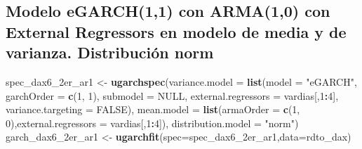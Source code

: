 \documentclass[
  11pt,
]{article}
\newenvironment{Shaded}{\begin{snugshade}}{\end{snugshade}}
\newcommand{\DataTypeTok}[1]{\textcolor[rgb]{0.13,0.29,0.53}{#1}}
\newcommand{\DecValTok}[1]{\textcolor[rgb]{0.00,0.00,0.81}{#1}}
\newcommand{\KeywordTok}[1]{\textcolor[rgb]{0.13,0.29,0.53}{\textbf{#1}}}
\newcommand{\NormalTok}[1]{#1}
\newcommand{\OperatorTok}[1]{\textcolor[rgb]{0.81,0.36,0.00}{\textbf{#1}}}
\newcommand{\OtherTok}[1]{\textcolor[rgb]{0.56,0.35,0.01}{#1}}
\newcommand{\StringTok}[1]{\textcolor[rgb]{0.31,0.60,0.02}{#1}}
\begin{document}
\hypertarget{modelo-egarch11-con-arma10-con-external-regressors-en-modelo-de-media-y-de-varianza.-distribuciuxf3n-norm}{%
\subsection{Modelo eGARCH(1,1) con ARMA(1,0) con External Regressors en
modelo de media y de varianza. Distribución
norm}\label{modelo-egarch11-con-arma10-con-external-regressors-en-modelo-de-media-y-de-varianza.-distribuciuxf3n-norm}}

\begin{Shaded}
\begin{Highlighting}[]
\NormalTok{spec_dax6_2er_ar1 <-}\StringTok{ }\KeywordTok{ugarchspec}\NormalTok{(}\DataTypeTok{variance.model =} \KeywordTok{list}\NormalTok{(}\DataTypeTok{model =} \StringTok{"eGARCH"}\NormalTok{, }\DataTypeTok{garchOrder =} \KeywordTok{c}\NormalTok{(}\DecValTok{1}\NormalTok{, }\DecValTok{1}\NormalTok{), }
                    \DataTypeTok{submodel =} \OtherTok{NULL}\NormalTok{, }\DataTypeTok{external.regressors =}\NormalTok{ vardias[,}\DecValTok{1}\OperatorTok{:}\DecValTok{4}\NormalTok{], }\DataTypeTok{variance.targeting =} \OtherTok{FALSE}\NormalTok{), }
                    \DataTypeTok{mean.model =} \KeywordTok{list}\NormalTok{(}\DataTypeTok{armaOrder =} \KeywordTok{c}\NormalTok{(}\DecValTok{1}\NormalTok{, }\DecValTok{0}\NormalTok{),}\DataTypeTok{external.regressors =}\NormalTok{ vardias[,}\DecValTok{1}\OperatorTok{:}\DecValTok{4}\NormalTok{]),}
               \DataTypeTok{distribution.model =} \StringTok{"norm"}\NormalTok{)}
\NormalTok{garch_dax6_2er_ar1 <-}\StringTok{ }\KeywordTok{ugarchfit}\NormalTok{(}\DataTypeTok{spec=}\NormalTok{spec_dax6_2er_ar1,}\DataTypeTok{data=}\NormalTok{rdto_dax)}
\end{Highlighting}
\end{Shaded}
\end{document}
